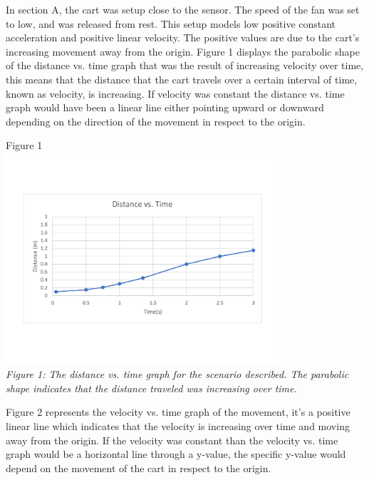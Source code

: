 \documentclass[aps,letterpaper,11pt]{revtex4}
\begin{document}
In section A, the cart was setup close to the sensor. The speed of the fan was set to low, and was released from rest. This setup models low positive constant acceleration and positive linear velocity. The positive values are due to the cart's increasing movement away from the origin. Figure 1 displays the parabolic shape of the distance vs. time graph that was the result of increasing velocity over time, this means that the distance that the cart travels over a certain interval of time, known as velocity, is increasing. If velocity was constant the distance vs. time graph would have been a linear line either pointing upward or downward depending on the direction of the movement in respect to the origin. 

\begin{center}
Figure 1\\
\vspace{-10mm}
\includegraphics[width=4in]{PartADistvsTime.pdf}\\
\vspace{-10mm}
\textit{Figure 1: The distance vs. time graph for the scenario described. The parabolic shape indicates that the distance traveled was increasing over time.}
\end{center}

Figure 2 represents the velocity vs. time graph of the movement, it's a positive linear line which indicates that the velocity is increasing over time and moving away from the origin. If the velocity was constant than the velocity vs. time graph would be a horizontal line through a y-value, the specific y-value would depend on the movement of the cart in respect to the origin. 
\end{document}
